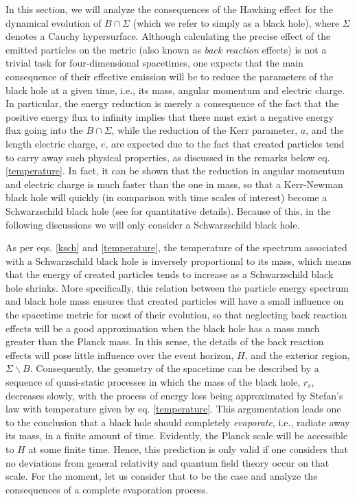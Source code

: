 \documentclass[
12pt,		%
openright,	%
twoside,  %
a4paper,			%
chapter=TITLE,		%
english,			%
french,				%
spanish,			%
brazil				%
]{USPSC-classe/USPSC}
\begin{document}
In this section, we will analyze the consequences of the Hawking effect for the dynamical evolution of $B\cap\Sigma$ (which we refer to simply as a black hole), where $\Sigma$ denotes a Cauchy hypersurface. Although calculating the precise effect of the emitted particles on the metric (also known as \textit{back reaction} effects) is not a trivial task for four-dimensional spacetimes, one expects that the main consequence of their effective emission will be to reduce the parameters of the black hole at a given time, i.e., its mass, angular momentum and electric charge. In particular, the energy reduction is merely a consequence of the fact that the positive energy flux to infinity implies that there must exist a negative energy flux going into the $B\cap\Sigma$, while the reduction of the Kerr parameter, $a$, and the length electric charge, $e$, are expected due to the fact that created particles tend to carry away such physical properties, as discussed in the remarks below eq. \ref{temperature}. In fact, it can be shown that the reduction in angular momentum and electric charge is much faster than the one in mass, so that a Kerr-Newman black hole will quickly (in comparison with time scales of interest) become a Schwarzschild black hole (see \cite{Page1976, Page1976a, Page1977} for quantitative details). Because of this, in the following discussions we will only consider a Schwarzschild black hole. 

As per eqs. \ref{ksch} and \ref{temperature}, the temperature of the spectrum associated with a Schwarzschild black hole is inversely proportional to its mass, which means that the energy of created particles tends to increase as a Schwarzschild black hole shrinks. More specifically, this relation between the particle energy spectrum and black hole mass ensures that created particles will have a small influence on the spacetime metric for most of their evolution, so that neglecting back reaction effects will be a good approximation when the black hole has a mass much greater than the Planck mass. In this sense, the details of the back reaction effects will pose little influence over the event horizon, $H$, and the exterior region, $\Sigma\backslash B$. Consequently, the geometry of the spacetime can be described by a sequence of quasi-static processes in which the mass of the black hole, $r_s$, decreases slowly, with the process of energy loss being approximated by Stefan's law \cite{Swendsen2020} with temperature given by eq. \ref{temperature}. This argumentation leads one to the conclusion that a black hole should completely \textit{evaporate}, i.e., radiate away its mass, in a finite amount of time. Evidently, the Planck scale will be accessible to $H$ at some finite time. Hence, this prediction is only valid if one considers that no deviations from general relativity and quantum field theory occur on that scale. For the moment, let us consider that to be the case and analyze the consequences of a complete evaporation process. 
\end{document}
